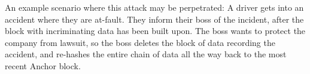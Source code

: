          An example scenario where this attack may be perpetrated: \newline A driver gets into an accident where they are at-fault. They inform their boss of the incident, after the block with incriminating data has been built upon. The boss wants to protect the company from lawsuit, so the boss deletes the block of data recording the accident, and re-hashes the entire chain of data all the way back to the most recent Anchor block.